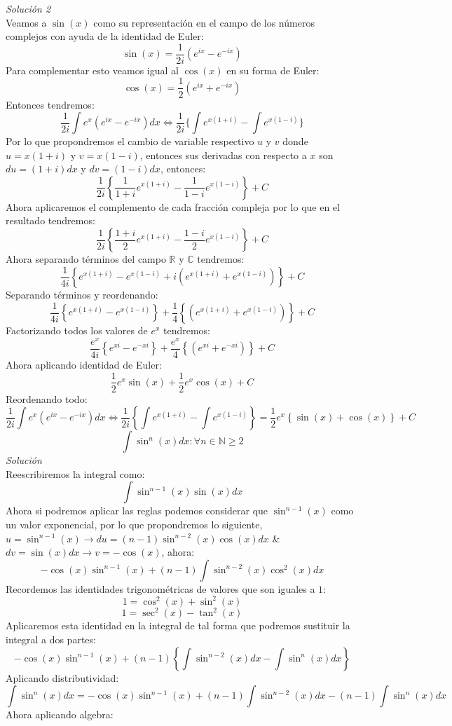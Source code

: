 \documentclass[10pt,executivepaper]{article}
\begin{document}
\textit{Solución 2}\\
Veamos a $\sin(x)$ como su representación en el campo de los números complejos con ayuda de la identidad de Euler:
\[\sin(x)= \frac{1}{2i}(e^{ix}-e^{-ix})\]
Para complementar esto veamos igual al $\cos(x)$ en su forma de Euler:
\[\cos(x)= \frac{1}{2}(e^{ix}+e^{-ix})\]
Entonces tendremos:
\[\frac{1}{2i}\int e^{x}(e^{ix}-e^{-ix})dx \Leftrightarrow \frac{1}{2i}\{\int e^{x(1+i)} - \int e^{x(1-i)}\}\]
Por lo que propondremos el cambio de variable respectivo $u$ y $v$ donde $u=x(1+i)$ y $v=x(1-i)$, entonces sus derivadas con respecto a $x$ son $du=(1+i)dx$ y $dv=(1-i)dx$, entonces:
\[\frac{1}{2i}\left\{\frac{1}{1+i}e^{x(1+i)}-\frac{1}{1-i}e^{x(1-i)}\right\}+C\]
Ahora aplicaremos el complemento de cada fracción compleja por lo que en el resultado tendremos:
\[\frac{1}{2i}\left\{\frac{1+i}{2}e^{x(1+i)}-\frac{1-i}{2}e^{x(1-i)}\right\}+C\]
Ahora separando términos del campo $\mathbb{R}$ y $\mathbb{C}$ tendremos:
\[\frac{1}{4i}\left\{e^{x(1+i)}-e^{x(1-i)} + i(e^{x(1+i)}+e^{x(1-i)})\right\}+C\]
Separando términos y reordenando:
\[\frac{1}{4i}\left\{e^{x(1+i)}-e^{x(1-i)}\right\} + \frac{1}{4}\left\{(e^{x(1+i)}+e^{x(1-i)})\right\}+C\]
Factorizando todos los valores de $e^{x}$ tendremos:
\[\frac{e^{x}}{4i}\left\{e^{xi}-e^{-xi}\right\} + \frac{e^{x}}{4}\left\{(e^{xi}+e^{-xi})\right\}+C\]
Ahora aplicando identidad de Euler:
\[\frac{1}{2}e^{x}\sin(x) + \frac{1}{2}e^{x}\cos(x)+C\]
Reordenando todo:
\[\frac{1}{2i}\int e^{x}(e^{ix}-e^{-ix})dx \Leftrightarrow \frac{1}{2i}\left\{\int e^{x(1+i)} - \int e^{x(1-i)}\right\} = \frac{1}{2}e^x\left\{\sin(x)+\cos(x)\right\}+C\]
\clearpage
\[\int \sin^{n}(x)dx \colon \forall n\in\mathbb{N}\geq 2\]
\textit{Solución}\\
Reescribiremos la integral como:
\[\int \sin^{n-1}(x)\sin(x)dx\]
Ahora si podremos aplicar las reglas podemos considerar que $\sin^{n-1}(x)$ como un valor exponencial, por lo que propondremos lo siguiente, $u=\sin^{n-1}(x) \rightarrow du=(n-1)\sin^{n-2}(x)\cos(x)dx$ \& $dv = \sin(x)dx \rightarrow v=-\cos(x)$, ahora:
\[-\cos(x)\sin^{n-1}(x) + (n-1)\int \sin^{n-2}(x)\cos^{2}(x)dx\]
Recordemos las identidades trigonométricas de valores que son iguales a $1$:
\[1=\cos^2(x)+\sin^{2}(x)\]
\[1=\sec^{2}(x)-\tan^{2}(x)\]
Aplicaremos esta identidad en la integral de tal forma que podremos sustituir la integral a dos partes:
\[-\cos(x)\sin^{n-1}(x) + (n-1)\left\{\int \sin^{n-2}(x)dx -\int\sin^{n}(x)dx\right\}\]
Aplicando distributividad:
\[\int\sin^{n}(x)dx=-\cos(x)\sin^{n-1}(x) + (n-1)\int \sin^{n-2}(x)dx -(n-1)\int\sin^{n}(x)dx\]
Ahora aplicando algebra:
\end{document}

